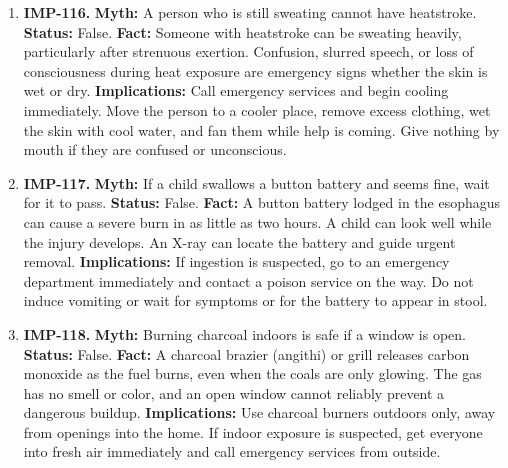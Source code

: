 \documentclass[11pt,oneside]{book}
\begin{document}
\begin{enumerate}[leftmargin=0pt,labelwidth=0pt,labelsep=0pt,itemindent=0pt]
\item[] \textbf{IMP-116.} \textbf{Myth:} A person who is still sweating cannot have heatstroke.\newline
\textbf{Status:} False.\newline
\textbf{Fact:} Someone with heatstroke can be sweating heavily, particularly after strenuous exertion. Confusion, slurred speech, or loss of consciousness during heat exposure are emergency signs whether the skin is wet or dry. \cite{ref502}\newline
\textbf{Implications:} Call emergency services and begin cooling immediately. Move the person to a cooler place, remove excess clothing, wet the skin with cool water, and fan them while help is coming. Give nothing by mouth if they are confused or unconscious.
\item[] \textbf{IMP-117.} \textbf{Myth:} If a child swallows a button battery and seems fine, wait for it to pass.\newline
\textbf{Status:} False.\newline
\textbf{Fact:} A button battery lodged in the esophagus can cause a severe burn in as little as two hours. A child can look well while the injury develops. An X-ray can locate the battery and guide urgent removal. \cite{ref503}\newline
\textbf{Implications:} If ingestion is suspected, go to an emergency department immediately and contact a poison service on the way. Do not induce vomiting or wait for symptoms or for the battery to appear in stool.
\item[] \textbf{IMP-118.} \textbf{Myth:} Burning charcoal indoors is safe if a window is open.\newline
\textbf{Status:} False.\newline
\textbf{Fact:} A charcoal brazier (angithi) or grill releases carbon monoxide as the fuel burns, even when the coals are only glowing. The gas has no smell or color, and an open window cannot reliably prevent a dangerous buildup. \cite{ref504}\newline
\textbf{Implications:} Use charcoal burners outdoors only, away from openings into the home. If indoor exposure is suspected, get everyone into fresh air immediately and call emergency services from outside.
\end{enumerate}


\end{document}
